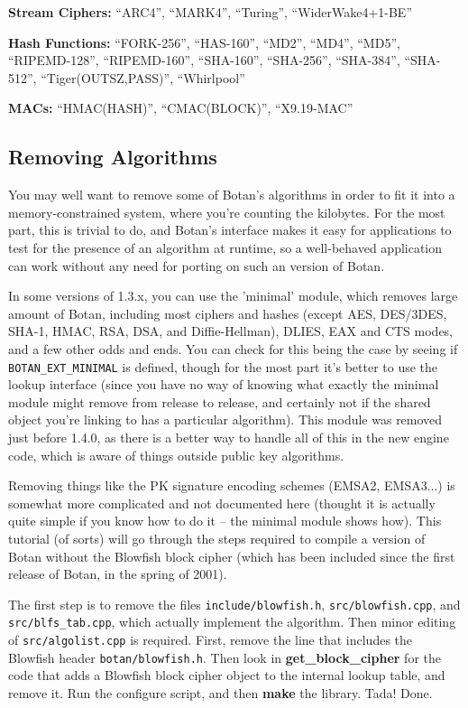 \documentclass{article}
\newcommand{\filename}[1]{\texttt{#1}}
\newcommand{\macro}[1]{\texttt{#1}}
\newcommand{\function}[1]{\textbf{#1}}
\begin{document}
\noindent
\textbf{Stream Ciphers:} ``ARC4'', ``MARK4'', ``Turing'', ``WiderWake4+1-BE''

\noindent
\textbf{Hash Functions:} ``FORK-256'', ``HAS-160'', ``MD2'', ``MD4'', ``MD5'',
``RIPEMD-128'', ``RIPEMD-160'', ``SHA-160'', ``SHA-256'', ``SHA-384'',
``SHA-512'', ``Tiger(OUTSZ,PASS)'', ``Whirlpool''

\noindent
\textbf{MACs:} ``HMAC(HASH)'', ``CMAC(BLOCK)'', ``X9.19-MAC''

\subsection{Removing Algorithms}

You may well want to remove some of Botan's algorithms in order to fit it into
a memory-constrained system, where you're counting the kilobytes. For the most
part, this is trivial to do, and Botan's interface makes it easy for
applications to test for the presence of an algorithm at runtime, so a
well-behaved application can work without any need for porting on such an
version of Botan.

In some versions of 1.3.x, you can use the 'minimal' module, which removes
large amount of Botan, including most ciphers and hashes (except AES, DES/3DES,
SHA-1, HMAC, RSA, DSA, and Diffie-Hellman), DLIES, EAX and CTS modes, and a few
other odds and ends. You can check for this being the case by seeing if
\macro{BOTAN\_EXT\_MINIMAL} is defined, though for the most part it's better to
use the lookup interface (since you have no way of knowing what exactly the
minimal module might remove from release to release, and certainly not if the
shared object you're linking to has a particular algorithm). This module was
removed just before 1.4.0, as there is a better way to handle all of this in
the new engine code, which is aware of things outside public key algorithms.

Removing things like the PK signature encoding schemes (EMSA2, EMSA3...) is
somewhat more complicated and not documented here (thought it is actually quite
simple if you know how to do it -- the minimal module shows how). This tutorial
(of sorts) will go through the steps required to compile a version of Botan
without the Blowfish block cipher (which has been included since the first
release of Botan, in the spring of 2001).

The first step is to remove the files \filename{include/blowfish.h},
\filename{src/blowfish.cpp}, and \filename{src/blfs\_tab.cpp}, which actually
implement the algorithm. Then minor editing of \filename{src/algolist.cpp} is
required. First, remove the line that includes the Blowfish header
\filename{botan/blowfish.h}. Then look in \function{get\_block\_cipher} for the
code that adds a Blowfish block cipher object to the internal lookup table, and
remove it. Run the configure script, and then \textbf{make} the library. Tada!
Done.
\end{document}
